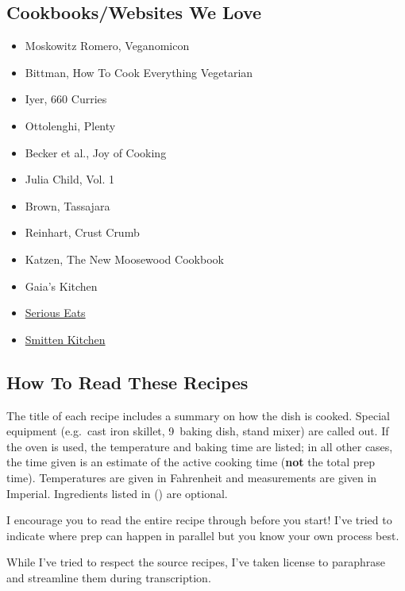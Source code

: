 \subsection{Cookbooks/Websites We Love}
\begin{itemize}
  \item Moskowitz \And Romero, Veganomicon
 \item Bittman, How To Cook Everything Vegetarian
 \item Iyer, 660 Curries
 \item Ottolenghi, Plenty
 \item Becker et al., Joy of Cooking
 \item Julia Child, Vol. 1
 \item Brown, Tassajara
 \item Reinhart, Crust \And Crumb
 \item Katzen, The New Moosewood Cookbook
 \item Gaia’s Kitchen
 \item \href{https://www.seriouseats.com/}{Serious Eats}
 \item \href{https://smittenkitchen.com/}{Smitten Kitchen}
\end{itemize}

\subsection{How To Read These Recipes}
The title of each recipe includes a summary on how the dish is cooked. Special equipment (e.g.\ cast iron skillet, 9\inch{}\inch\ baking dish, stand mixer) are called out. If the oven is used, the temperature and baking time are listed; in all other cases, the time given is an estimate of the active cooking time (\textbf{not} the total prep time). Temperatures are given in Fahrenheit and measurements are given in Imperial. Ingredients listed in () are optional.

I encourage you to read the entire recipe through before you start! I've tried to indicate where prep can happen in parallel but you know your own process best.

While I've tried to respect the source recipes, I've taken license to paraphrase and streamline them during transcription.
